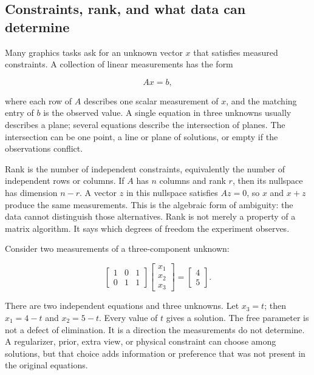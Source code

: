 \subsection{Constraints, rank, and what data can determine}\label{01-foundations-i-ch019-constraints-rank-and-what-data-can-determine}

\hypertarget{01-foundations-i-ch019-constraints-rank-and-what-data-can-determine}{}

Many graphics tasks ask for an unknown vector \(x\) that satisfies measured constraints. A collection of linear measurements has the form

\[
Ax=b,
\]

where each row of \(A\) describes one scalar measurement of \(x\), and the matching entry of \(b\) is the observed value. A single equation in three unknowns usually describes a plane; several equations describe the intersection of planes. The intersection can be one point, a line or plane of solutions, or empty if the observations conflict.

Rank is the number of independent constraints, equivalently the number of independent rows or columns. If \(A\) has \(n\) columns and rank \(r\), then its nullspace has dimension \(n-r\). A vector \(z\) in this nullspace satisfies \(Az=0\), so \(x\) and \(x+z\) produce the same measurements. This is the algebraic form of ambiguity: the data cannot distinguish those alternatives. Rank is not merely a property of a matrix algorithm. It says which degrees of freedom the experiment observes.

Consider two measurements of a three-component unknown:

\[
\begin{bmatrix}1&0&1\\0&1&1\end{bmatrix}
\begin{bmatrix}x_1\\x_2\\x_3\end{bmatrix}
=
\begin{bmatrix}4\\5\end{bmatrix}.
\]

There are two independent equations and three unknowns. Let \(x_3=t\); then \(x_1=4-t\) and \(x_2=5-t\). Every value of \(t\) gives a solution. The free parameter is not a defect of elimination. It is a direction the measurements do not determine. A regularizer, prior, extra view, or physical constraint can choose among solutions, but that choice adds information or preference that was not present in the original equations.

